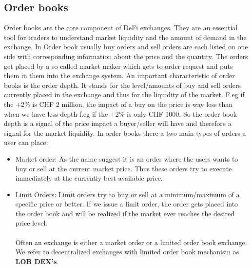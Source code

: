 \documentclass{article}
\begin{document}
\subsection{Order books}
Order books are the core component of DeFi exchanges. They are an essential tool for traders to understand market liquidity and the amount of demand in the exchange. In Order book usually buy orders and sell orders are each listed on one side with corresponding information about the price and the quantity. The orders get placed by a so called market maker which gets to order request and puts them in them into the exchange system. An important characteristic of order books is the order depth. It stands for the level/amounts of buy and sell orders currently placed in the exchange and thus for the liquidity of the market. F.eg if the +2\% is CHF 2 million, the impact of a buy on the price is way less than when we have less depth f.eg if  the +2\% is only CHF 1000. So the order book depth is a signal of the price impact a buyer/seller will have and therefore a signal for the market liquidity. In order books there a two main types of orders a user can place:
\begin{itemize}
    \item {Market order}: As the name suggest it is an order where the users wants to buy or sell at the current market price. Thus these orders try to execute immediately at the currently best available price.
    \item {Limit Orders}: Limit orders try to buy or sell at a minimum/maximum of a specific price or better. If we issue a limit order, the order gets placed into the order book and will be realized if the market ever reaches the desired price level.\\
    \\
    Often an exchange is either a market order or a limited order book exchange. We refer to decentralized exchanges with limited order book mechanism as \textbf{LOB DEX's}.
\end{itemize}
\end{document}
